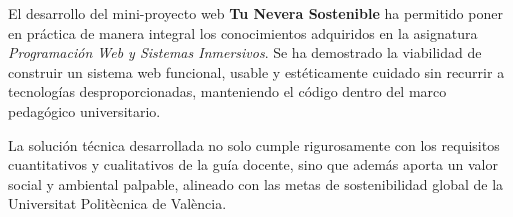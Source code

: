 \documentclass[11pt,a4paper]{article}
\begin{document}
El desarrollo del mini-proyecto web \textbf{Tu Nevera Sostenible} ha permitido poner en práctica de manera integral los conocimientos adquiridos en la asignatura \textit{Programación Web y Sistemas Inmersivos}. Se ha demostrado la viabilidad de construir un sistema web funcional, usable y estéticamente cuidado sin recurrir a tecnologías desproporcionadas, manteniendo el código dentro del marco pedagógico universitario. 

La solución técnica desarrollada no solo cumple rigurosamente con los requisitos cuantitativos y cualitativos de la guía docente, sino que además aporta un valor social y ambiental palpable, alineado con las metas de sostenibilidad global de la Universitat Politècnica de València.
\end{document}
